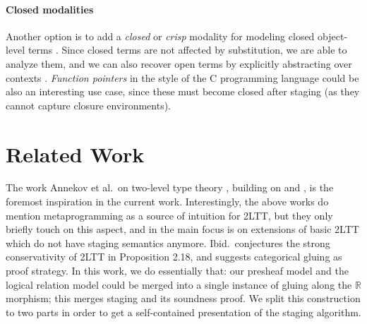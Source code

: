 \documentclass[acmsmall,screen]{acmart}
\newcommand{\msf}[1]{\mathsf{#1}}
\newcommand{\mbb}[1]{\mathbb{#1}}
\newcommand{\Bool}{\msf{Bool}}
\newcommand{\true}{\msf{true}}
\newcommand{\false}{\msf{false}}
\newcommand{\re}{\mbb{R}}
\theoremstyle{remark}
\begin{document}
\paragraph{Closed modalities}\label{sec:closed-modalities}
Another option is to add a \emph{closed} or \emph{crisp} modality for modeling
closed object-level terms \cite{licata2018internal}. Since closed terms are not
affected by substitution, we are able to analyze them, and we can also recover
open terms by explicitly abstracting over contexts
\cite{DBLP:conf/lics/Hofmann99,DBLP:journals/corr/abs-2206-02831}. \emph{Function
pointers} in the style of the C programming language could be also an
interesting use case, since these must become closed after staging (as they
cannot capture closure environments).


\section{Related Work}\label{sec:related-work}

The work Annekov et al.\ on two-level type theory \cite{twolevel}, building on
\cite{capriotti2017models} and \cite{hts}, is the foremost inspiration in
the current work. Interestingly, the above works do mention metaprogramming as a
source of intuition for 2LTT, but they only briefly touch on this aspect, and in
\cite{twolevel} the main focus is on extensions of basic 2LTT which do not have
staging semantics anymore. Ibid.\ conjectures the strong conservativity of 2LTT
in Proposition 2.18, and suggests categorical gluing as proof strategy. In this
work, we do essentially that: our presheaf model and the logical relation model
could be merged into a single instance of gluing along the $\re$ morphism; this
merges staging and its soundness proof. We split this construction to two parts
in order to get a self-contained presentation of the staging algorithm.
\end{document}
